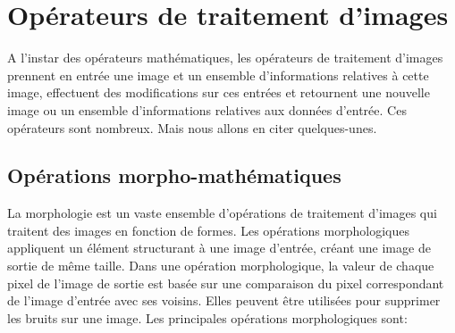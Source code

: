 \section{Opérateurs de traitement d'images}
A l’instar des opérateurs mathématiques, les opérateurs de traitement d’images prennent en entrée une image et un ensemble d’informations relatives à cette image, effectuent des modifications sur ces entrées et retournent une nouvelle image ou un ensemble d’informations relatives aux données d’entrée. Ces opérateurs sont nombreux. Mais nous allons en citer quelques-unes.
    \subsection{Opérations morpho-mathématiques}
La morphologie est un vaste ensemble d'opérations de traitement d'images qui traitent des images en fonction de formes. Les opérations morphologiques appliquent un élément structurant à une image d'entrée, créant une image de sortie de même taille. Dans une opération morphologique, la valeur de chaque pixel de l'image de sortie est basée sur une comparaison du pixel correspondant de l'image d'entrée avec ses voisins. Elles peuvent être utilisées pour supprimer les bruits sur une image. Les principales opérations morphologiques sont:
